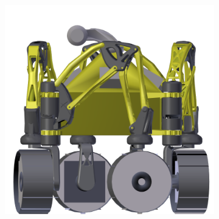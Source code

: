 \begin{figure}[h]
\captionsetup[subfigure]{justification=centering}
\vspace{-2ex}
	\centering
    \setlength{\subfigureWidth}{0.50\textwidth}
    \setlength{\graphicsHeight}{50mm}
    \hypersetup{hidelinks=true}%
    \begin{subfigure}[t]{\subfigureWidth}
        \centering
        \includegraphics[height=\graphicsHeight]{sections/power-system-design/solar-array/images/stowed-body-pyramid.png}
		\label{fig:sub:rover-body-redesign-stowed-before}
    \end{subfigure}\hfill
    \begin{subfigure}[t]{\subfigureWidth}
        \centering

\end{subfigure}
\end{figure}
